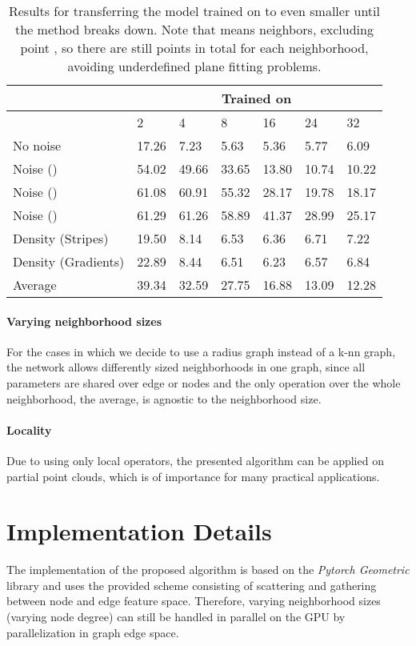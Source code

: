 \documentclass[10pt,twocolumn,letterpaper]{article}
\begin{document}
\begin{table}[t]
\small
\setlength\tabcolsep{3.5pt}
\centering
\begin{tabular}{lllllll}
\toprule
& \multicolumn{6}{c}{Trained on } \\
\midrule
 & 2  &  4  & 8 & 16 & 24 & 32  \\ 
\midrule
No noise  & 17.26 &  7.23 & 5.63 & 5.36 & 5.77 & 6.09  \\ 
Noise ()  & 54.02 & 49.66  & 33.65 & 13.80 & 10.74 & 10.22 \\ 
Noise ()   & 61.08 & 60.91 & 55.32 & 28.17 & 19.78 & 18.17  \\ 
Noise () & 61.29 & 61.26 & 58.89 & 41.37 & 28.99 &  25.17  \\ 
Density (Stripes)   &  19.50 & 8.14 &6.53 & 6.36 & 6.71 & 7.22 \\
Density (Gradients)   & 22.89 & 8.44 & 6.51 & 6.23 & 6.57 & 6.84 \\ 
\midrule
Average    & 39.34 & 32.59 & 27.75 & 16.88 & 13.09 & 12.28 \\ 
\bottomrule
\end{tabular}
\caption{Results for transferring  the model trained on  to even smaller  until the method breaks down. Note that  means  neighbors, excluding point , so there are still  points in total for each neighborhood, avoiding underdefined plane fitting problems.}
\label{tab:transfer_smallk}
\end{table}


\paragraph{Varying neighborhood sizes} For the cases in which we decide to use a radius graph instead of a k-nn graph, the network allows differently sized neighborhoods in one graph, since all parameters are shared over edge or nodes and the only operation over the whole neighborhood, the average, is agnostic to the neighborhood size.

\paragraph{Locality}

Due to using only local operators, the presented algorithm can be applied on partial point clouds, which is of importance for many practical applications.


\section{Implementation Details}
\label{sec:implementation}
The implementation of the proposed algorithm is based on the \emph{Pytorch Geometric} library \cite{Fey:2019} and uses the provided scheme consisting of scattering and gathering between node and edge feature space. Therefore, varying neighborhood sizes (\eg varying node degree) can still be handled in parallel on the GPU by parallelization in graph edge space.
\end{document}
